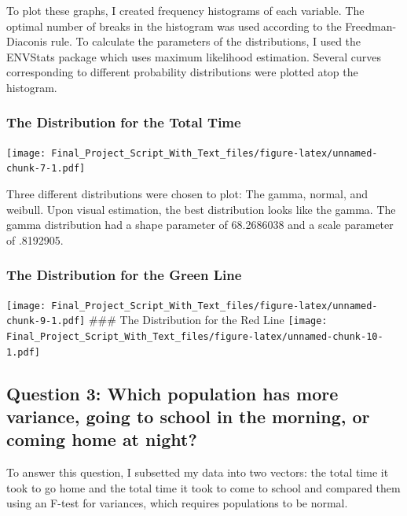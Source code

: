 \documentclass[
]{article}
\begin{document}
To plot these graphs, I created frequency histograms of each variable.
The optimal number of breaks in the histogram was used according to the
Freedman-Diaconis rule. To calculate the parameters of the
distributions, I used the ENVStats package which uses maximum likelihood
estimation. Several curves corresponding to different probability
distributions were plotted atop the histogram.

\hypertarget{the-distribution-for-the-total-time}{%
\subsubsection{The Distribution for the Total
Time}\label{the-distribution-for-the-total-time}}

\texttt{[image: Final\_Project\_Script\_With\_Text\_files/figure-latex/unnamed-chunk-7-1.pdf]}

Three different distributions were chosen to plot: The gamma, normal,
and weibull. Upon visual estimation, the best distribution looks like
the gamma. The gamma distribution had a shape parameter of 68.2686038
and a scale parameter of .8192905.

\hypertarget{the-distribution-for-the-green-line}{%
\subsubsection{The Distribution for the Green
Line}\label{the-distribution-for-the-green-line}}

\texttt{[image: Final\_Project\_Script\_With\_Text\_files/figure-latex/unnamed-chunk-9-1.pdf]}
\#\#\# The Distribution for the Red Line
\texttt{[image: Final\_Project\_Script\_With\_Text\_files/figure-latex/unnamed-chunk-10-1.pdf]}

\hypertarget{question-3-which-population-has-more-variance-going-to-school-in-the-morning-or-coming-home-at-night}{%
\subsection{Question 3: Which population has more variance, going to
school in the morning, or coming home at
night?}\label{question-3-which-population-has-more-variance-going-to-school-in-the-morning-or-coming-home-at-night}}

To answer this question, I subsetted my data into two vectors: the total
time it took to go home and the total time it took to come to school and
compared them using an F-test for variances, which requires populations
to be normal.
\end{document}
